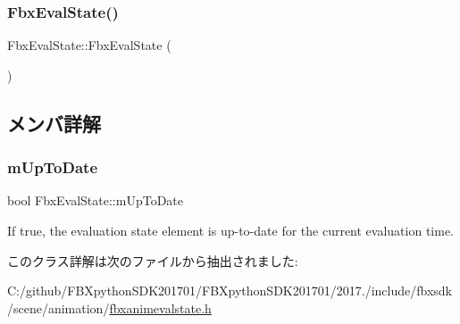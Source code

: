 \subsubsection{\texorpdfstring{Fbx\+Eval\+State()}{FbxEvalState()}}
{\footnotesize\ttfamily Fbx\+Eval\+State\+::\+Fbx\+Eval\+State (\begin{DoxyParamCaption}{ }\end{DoxyParamCaption})}



\subsection{メンバ詳解}
\mbox{\label{class_fbx_eval_state_a9c153054cba876e54d38046e582b32d0}} 
\subsubsection{\texorpdfstring{m\+Up\+To\+Date}{mUpToDate}}
{\footnotesize\ttfamily bool Fbx\+Eval\+State\+::m\+Up\+To\+Date}



If {\ttfamily true}, the evaluation state element is up-\/to-\/date for the current evaluation time. 



このクラス詳解は次のファイルから抽出されました\+:\begin{DoxyCompactItemize}
\item 
C\+:/github/\+F\+B\+Xpython\+S\+D\+K201701/\+F\+B\+Xpython\+S\+D\+K201701/2017./include/fbxsdk/scene/animation/\hyperlink{fbxanimevalstate_8h}{fbxanimevalstate.\+h}\end{DoxyCompactItemize}
